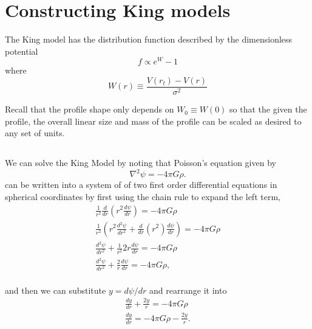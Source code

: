 \section{Constructing King models}
The King model has the distribution function described by the dimensionless potential
\begin{equation}
    f\propto e^W -1
\end{equation}
where 
\begin{equation}
    W(r)\equiv\frac{V(r_t)-V(r)}{\sigma^2}
\end{equation}

Recall that the profile shape only depends on $W_0 \equiv W(0)$ so that the given the
profile, the overall linear size and mass of the profile can be scaled as
desired to any set of units.

\subsection{}
We can solve the King Model by noting that Poisson's equation given by
\begin{equation}
    \nabla^2\psi=-4\pi G\rho.
\end{equation}
can be written into a system of of two first order differential equations in spherical coordinates by first using the chain rule to expand the left term,
\begin{align*}
    \frac{1}{r^2}\frac{d}{dr}\left(r^2\frac{d\psi}{dr}\right)=-4\pi G \rho\\
    \frac{1}{r^2}\left(r^2\frac{d^2\psi}{dr^2}+\frac{d}{dr}(r^2)\frac{d\psi}{dr}\right)=-4\pi G\rho\\
    \frac{d^2\psi}{dr^2}+\frac{1}{r^2}2r\frac{d\psi}{dr}=-4\pi G\rho\\
    \frac{d^2\psi}{dr^2}+\frac{2}{r}\frac{d\psi}{dr}=-4\pi G\rho,\\
\end{align*}

and then we can substitute $y=d\psi/dr$ and rearrange it into
\begin{align*}
    \frac{dy}{dr}+\frac{2y}{r}=-4\pi G\rho\\
    \frac{dy}{dr}=-4\pi G\rho-\frac{2y}{r}.
\end{align*}

